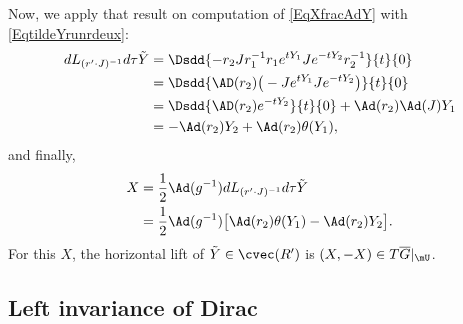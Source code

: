 Now, we apply that result on computation of \eqref{EqXfracAdY} with \eqref{EqtildeYrunrdeux}:
\begin{align*}
	dL_{(r'\cdot J)^{-1}}d\tau\tilde Y & =\Dsdd{ -r_2Jr_1^{-1}r_1 e^{tY_{1}}J e^{-tY_{2}}r_2^{-1} }{t}{0} \\
	                                   & =\Dsdd{ \AD(r_2)\big( -J e^{tY_{1}}J e^{-tY_{2}} \big) }{t}{0}   \\
	                                   & =\Dsdd{ \AD(r_2) e^{-tY_{2}} }{t}{0}+\Ad(r_2)\Ad(J)Y_{1}         \\
	                                   & =-\Ad(r_2)Y_{2}+\Ad(r_2)\theta(Y_{1}),
\end{align*}
and finally,
\begin{equation}  \label{EqValeurXAdtheta}
	\begin{aligned}
		X & =\frac{ 1 }{2}\Ad(g^{-1})dL_{(r'\cdot J)^{-1}}d\tau\tilde Y               \\
		  & =\frac{ 1 }{2}\Ad(g^{-1})\big[ \Ad(r_2)\theta(Y_{1})-\Ad(r_2)Y_{2} \big].
	\end{aligned}
\end{equation}
For this $X$, the horizontal lift of $\tilde Y\in\cvec(R')$ is $(X,-X)\in T\overline{G}|_{\mU}$.

\subsection{Left invariance of Dirac}


